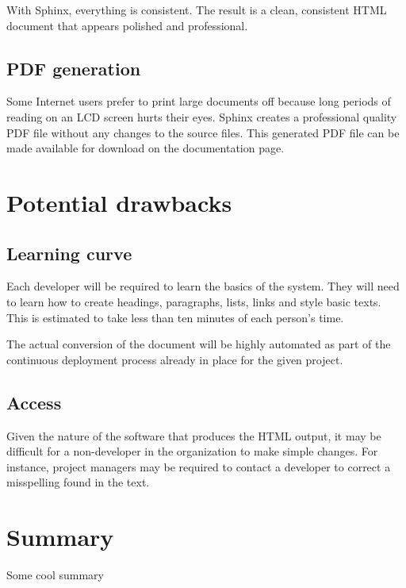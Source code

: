 \documentclass[letterpaper]{report}
\begin{document}
        With Sphinx, everything is consistent. The result is a clean,
        consistent HTML document that appears polished and professional.

    \subsection*{PDF generation}

        Some Internet users prefer to print large documents off because long
        periods of reading on an LCD screen hurts their eyes. Sphinx creates a
        professional quality PDF file without any changes to the source files.
        This generated PDF file can be made available for download on the
        documentation page.

\section*{Potential drawbacks}

    \subsection*{Learning curve}
    
        Each developer will be required to learn the basics of the system. They
        will need to learn how to create headings, paragraphs, lists, links and
        style basic texts. This is estimated to take less than ten minutes of
        each person's time.

        The actual conversion of the document will be highly automated as part
        of the continuous deployment process already in place for the given
        project.

    \subsection*{Access}

        Given the nature of the software that produces the HTML output, it may
        be difficult for a non-developer in the organization to make simple
        changes. For instance, project managers may be required to contact a
        developer to correct a misspelling found in the text.

\section*{Summary}

    Some cool summary
\end{document}

